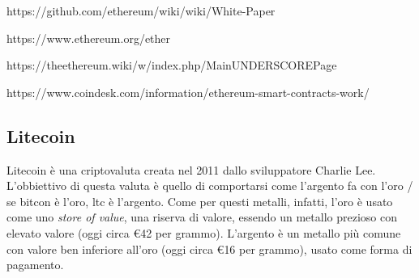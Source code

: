 \documentclass {article}
\begin{document}
https://github.com/ethereum/wiki/wiki/White-Paper

https://www.ethereum.org/ether

https://theethereum.wiki/w/index.php/MainUNDERSCOREPage

https://www.coindesk.com/information/ethereum-smart-contracts-work/


\subsection {Litecoin}


Litecoin è una criptovaluta creata nel 2011 dallo sviluppatore Charlie Lee. L'obbiettivo di questa valuta è quello di comportarsi come l'argento fa con l'oro  /  se bitcon è l'oro, ltc è l'argento.
Come per questi metalli, infatti, l'oro è usato come uno \textit{store of value}, una riserva di valore, essendo un metallo prezioso con elevato valore (oggi circa \euro{42} per grammo). L'argento è un metallo più comune con valore ben inferiore all'oro (oggi circa \euro{16} per grammo), usato come forma di pagamento.
\end{document}
